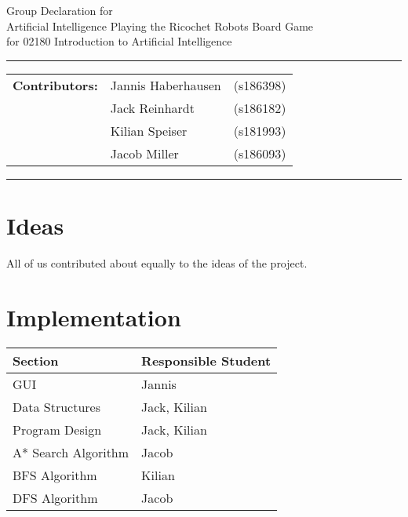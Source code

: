 \documentclass[a4paper,10pt]{article}
\begin{document}
\begin{center}
Group Declaration for\\
\vspace{0.5cm}
{{\Large \sc Artificial Intelligence Playing the Ricochet Robots Board Game}}\\
\vspace{0.5cm} for 02180 Introduction to Artificial Intelligence
\end{center}
\rule{\textwidth}{0.5pt}
\begin{description}
\item\begin{tabular}{rll}
    \textbf{Contributors:}& Jannis Haberhausen &(s186398)\\ & Jack Reinhardt &(s186182)\\ & Kilian Speiser &(s181993)\\ & Jacob Miller &(s186093) \\
\end{tabular}
\end{description}
\rule{\textwidth}{1pt}

\section*{\large{Ideas}}
All of us contributed about equally to the ideas of the project.


\section*{\large{Implementation}}
\begin{table}[!ht]
\centering
\begin{tabular}{l|l} \hline
    \textbf{Section} & \textbf{Responsible Student} \\ \hline
    GUI & Jannis \\
    Data Structures & Jack, Kilian \\
    Program Design & Jack, Kilian \\
    A* Search Algorithm & Jacob \\
    BFS Algorithm & Kilian \\
    DFS Algorithm & Jacob \\
\end{tabular}
\end{table}
\end{document}
